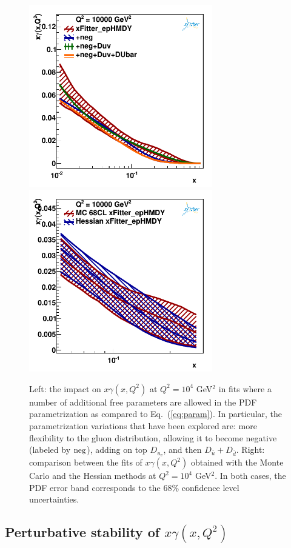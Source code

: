\begin{figure}[t]
\centering
\includegraphics[width=8cm]{figs/q2_10000_pdf_ph_param_var.pdf}
\includegraphics[width=8cm]{figs/photon_mc_vs_hessian} 
\caption{Left: the impact on $x\gamma(x,Q^2)$ at $Q^2=10^4$ GeV$^2$
  in fits where a number of additional free parameters are allowed
  in the PDF parametrization as compared to Eq.~(\ref{eq:param}).
  In particular, the parametrization variations that have been explored
  are: more flexibility to the gluon distribution, allowing
  it to become negative
 (labeled by ${\rm neg}$), adding on top $D_{u_v}$, and then $D_{\bar{u}}+D_{\bar{d}}$.
 Right: comparison between the fits of $x\gamma(x,Q^2)$ obtained with the
  Monte Carlo and the Hessian methods at $Q^2=10^4$ GeV$^2$.
  In both cases, the PDF error band corresponds to the 68\% confidence level
  uncertainties.
}
\label{fig:param}
\label{fig:photon_mc_vs_hessian}
\end{figure}


\subsection{Perturbative stability of $x\gamma(x,Q^2)$}

